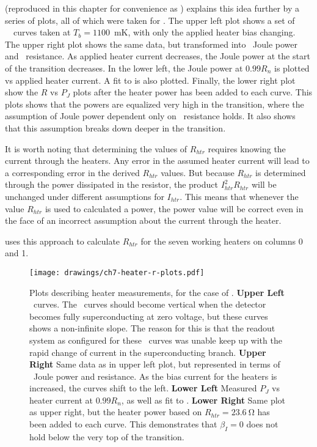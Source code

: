  (reproduced in this chapter for convenience as ) explains this idea further by a series of plots, all of which were taken for .
The upper left plot shows a set of \TES\ \IV\ curves taken at $T_b = 1100$~mK, with only the applied heater bias changing.
The upper right plot shows the same data, but transformed into \TES\ Joule power and \TES\ resistance.
As applied heater current decreases, the Joule power at the start of the transition decreases.
In the lower left, the Joule power at $0.99R_{n}$ is plotted vs applied heater current.
A fit to  is also plotted.
Finally, the lower right plot show the $R$ vs $P_J$ plots after the heater power has been added to each curve.
This plots shows that the powers are equalized very high in the transition, where the assumption of Joule power dependent only on \TES\ resistance holds.
It also shows that this assumption breaks down deeper in the transition.

It is worth noting that determining the values of $R_{htr}$ requires knowing the current through the heaters.
Any error in the assumed heater current will lead to a corresponding error in the derived $R_{htr}$ values.
But because $R_{htr}$ is determined through the power dissipated in the resistor, the product $I_{htr}^2 R_{htr}$ will be unchanged under different assumptions for $I_{htr}$.
This means that whenever the value $R_{htr}$ is used to calculated a power, the power value will be correct even in the face of an incorrect assumption about the current through the heater.

 uses this approach to calculate $R_{htr}$ for the seven working heaters on columns 0 and 1.

\begin{figure*}
\texttt{[image: drawings/ch7-heater-r-plots.pdf]}
\caption[Plots describing heater measurements]{
Plots describing heater measurements, for the case of .
\textbf{Upper Left} \IV\ curves. The \IV\ curves should become vertical when the detector becomes fully superconducting at zero voltage, but these curves shows a non-infinite slope. The reason for this is that the readout system as configured for these \IV\ curves was unable keep up with the rapid change of current in the superconducting branch.
\textbf{Upper Right} Same data as in upper left plot, but represented in terms of \TES\ Joule power and resistance. As the bias current for the heaters is increased, the curves shift to the left.
\textbf{Lower Left} Measured $P_{J}$ vs heater current at $0.99R_n$, as well as fit to .
\textbf{Lower Right} Same plot as upper right, but the heater power based on $R_{htr} = \SI{23.6}{\ohm}$ has been added to each curve.
This demonstrates that $\beta_I = 0$ does not hold below the very top of the transition.}
\label{fig:ch3-heater-r-plots}
\end{figure*}

